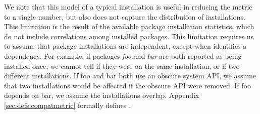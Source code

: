 \vspace{10pt}
We note that this model of a typical installation is useful in reducing the metric to a single number,
but also does not capture the distribution of installations.
This limitation is the result of the available package installation statistics,
which do not include correlations among installed packages.
This limitation requires us to 
assume that package installations are independent,
except when \osinstaller{} identifies a dependency.
For example, if packages {\em foo} and {\em bar} are both reported as being installed once,
we cannot tell if they were on the same installation, or if two different installations.
If foo and bar both use an obscure system API, we assume that two installations would be affected if the obscure API were removed.
If foo depends on bar, we assume the installations overlap. %
Appendix \ref{sec:defs:compatmetric} formally defines \compatmetric{}.



 

